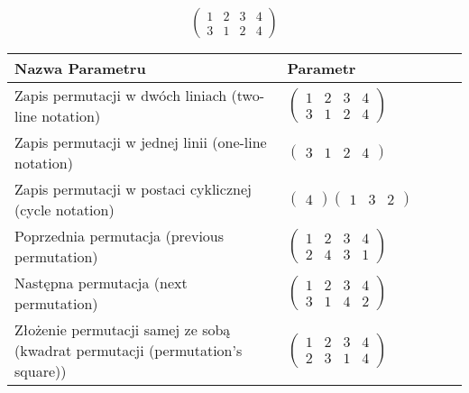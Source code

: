 \documentclass[12pt]{article}
\begin{document}
\subsection{}
\begin{center}
\[
\begin{pmatrix}
	1 & 2 & 3 & 4 \\ 
	3 & 1 & 2 & 4 
\end{pmatrix}
\]

\begin{tabular}{|m{0.6\linewidth}|m{0.4\linewidth}|}
	\hline
	Nazwa Parametru & Parametr \\
	\hline
	Zapis permutacji w dwóch liniach (two-line notation) & $\begin{pmatrix} 1 & 2 & 3 & 4 \\ 
3 & 1 & 2 & 4 \end{pmatrix}$ \\ 
	\hline
	Zapis permutacji w jednej linii (one-line notation) & $\begin{pmatrix} 3 & 1 & 2 & 4 \end{pmatrix}$ \\ 
	\hline
	Zapis permutacji w postaci cyklicznej (cycle notation) & $\begin{pmatrix} 4 \end{pmatrix} \begin{pmatrix} 1 & 3 & 2 \end{pmatrix} $ \\ 
	\hline
	Poprzednia permutacja (previous permutation) & $\begin{pmatrix} 1 & 2 & 3 & 4 \\ 
2 & 4 & 3 & 1 \end{pmatrix}$ \\ 
	\hline
	Następna permutacja (next permutation) & $\begin{pmatrix} 1 & 2 & 3 & 4 \\ 
3 & 1 & 4 & 2 \end{pmatrix}$ \\ 
	\hline
	Złożenie permutacji samej ze sobą (kwadrat permutacji (permutation's square)) & $\begin{pmatrix} 1 & 2 & 3 & 4 \\ 
2 & 3 & 1 & 4 \end{pmatrix}$ \\ 
	\hline
\end{tabular}
\end{center}
\end{document}
